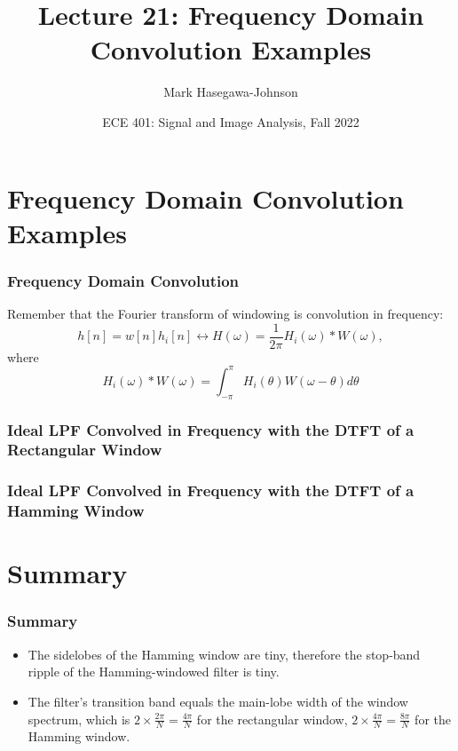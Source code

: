 \documentclass{beamer}
\title{Lecture 21: Frequency Domain Convolution Examples}
\author{Mark Hasegawa-Johnson}
\date{ECE 401: Signal and Image Analysis, Fall 2022}
\begin{document}
\begin{frame}
  \maketitle
\end{frame}

\begin{frame}
  \tableofcontents
\end{frame}

\section[Examples]{Frequency Domain Convolution Examples}
\setcounter{subsection}{1}

\begin{frame}
  \frametitle{Frequency Domain Convolution}

  Remember that the Fourier transform of windowing is convolution in
  frequency:
  \begin{displaymath}
    h[n] = w[n]h_i[n] \leftrightarrow H(\omega) = \frac{1}{2\pi} H_i(\omega)\ast W(\omega),
  \end{displaymath}
  where
  \begin{displaymath}
    H_i(\omega)\ast W(\omega) = \int_{-\pi}^\pi H_i(\theta)W(\omega-\theta)d\theta
  \end{displaymath}
\end{frame}

\begin{frame}
  \frametitle{Ideal LPF Convolved in Frequency with the DTFT of a Rectangular Window}
  \centerline{}
\end{frame}

\begin{frame}
  \frametitle{Ideal LPF Convolved in Frequency with the DTFT of a Hamming Window}
  \centerline{}
\end{frame}

\section[Summary]{Summary}
\setcounter{subsection}{1}

\begin{frame}
  \frametitle{Summary}
  \begin{itemize}
  \item The sidelobes of the Hamming window are tiny, therefore the
    stop-band ripple of the Hamming-windowed filter is tiny.
  \item The filter's transition band equals the main-lobe width of the
    window spectrum, which is $2\times \frac{2\pi}{N}=\frac{4\pi}{N}$
    for the rectangular window, $2\times \frac{4\pi}{N}=\frac{8\pi}{N}$ for the
    Hamming window.
  \end{itemize}
\end{frame}
\end{document}
